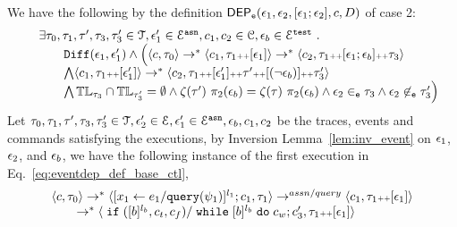 \begin{subproof}
%
\label{pf:eventdep_base_ctl}
We have the following by the definition $\mathsf{DEP_{\mathtt{e}}}(\mathtt{\epsilon}_1, \mathtt{\epsilon}_2, [\mathtt{\epsilon}_1; \mathtt{\epsilon}_2], c, D)$ of case 2:
\begin{equation}
  \label{eq:eventdep_def_base_ctl}
  \begin{array}{ll}   
    & \exists \mathtt{\tau}_0,
    \mathtt{\tau}_1, \mathtt{\tau}', \mathtt{\tau}_3, \mathtt{\tau}_3' \in \mathcal{T},\mathtt{\epsilon}_1' \in \mathcal{E}^{\mathtt{{asn}}}, {c}_1, {c}_2  \in \mathcal{C}, 
    \mathtt{\epsilon}_b \in \mathcal{E}^{\mathtt{{test}}}
    ~.~
    \\ 
   &   \qquad    \mathtt{Diff}(\mathtt{\epsilon}_1, \mathtt{\epsilon}_1') 
\land
   \Big(
  \langle {c}, \mathtt{\tau}_0 \rangle \rightarrow^{*} 
      \langle {c}_1, \mathtt{\tau}_1 {\scriptscriptstyle ++} [\mathtt{\epsilon}_1] \rangle  \rightarrow^{*} 
      \langle c_2,  \mathtt{\tau}_1 {\scriptscriptstyle ++} [\mathtt{\epsilon}_1;\mathtt{\epsilon}_b] {\scriptscriptstyle ++}  \mathtt{\tau}_3 \rangle 
    \\   
   & \qquad \bigwedge 
    \langle {c}_1, \mathtt{\tau}_1 {\scriptscriptstyle ++} [\mathtt{\epsilon}_1'] \rangle  \rightarrow^{*} 
    \langle c_2,  \mathtt{\tau}_1 {\scriptscriptstyle ++} [\mathtt{\epsilon}_1'] {\scriptscriptstyle ++} \mathtt{\tau}' {\scriptscriptstyle ++} [(\neg \mathtt{\epsilon}_b)] {\scriptscriptstyle ++} \mathtt{\tau}_3' \rangle 
    \\
    & \qquad \bigwedge  \mathbb{TL}_{\mathtt{\tau}_3} \cap \mathbb{TL}_{\mathtt{\tau}_3'} = \emptyset
     \land \mathtt{\zeta}(\mathtt{\tau}') ~  \pi_2(\mathtt{\epsilon}_b) = \mathtt{\zeta}(\mathtt{\tau}) ~  \pi_2(\mathtt{\epsilon}_b)
      \land \mathtt{\epsilon}_2 \in_{\mathtt{e}} \mathtt{\tau}_3
    \land \mathtt{\epsilon}_2 \not\in_{\mathtt{e}} \mathtt{\tau}_3'
   \Big)
 \end{array}
  \end{equation}
%
Let $\mathtt{\tau}_0,
\mathtt{\tau}_1, \mathtt{\tau}', \mathtt{\tau}_3, \mathtt{\tau}_3' \in \mathcal{T}, 
\mathtt{\epsilon}_2' \in \mathcal{E}, \mathtt{\epsilon}_1' \in \mathcal{E}^{\mathtt{{asn}}}, \mathtt{\epsilon}_b, {c}_1, {c}_2$ be the traces, events and commands satisfying the executions,
by Inversion Lemma~\ref{lem:inv_event} on 
$\mathtt{\epsilon}_1$, $\mathtt{\epsilon}_2$, and $\mathtt{\epsilon}_b$,
we have the following instance of the first execution in Eq.~\ref{eq:eventdep_def_base_ctl},
%
\begin{equation}
\label{eq:ctldep_inv1}
  \begin{array}{l}   
\langle {c}, \mathtt{\tau}_0 \rangle \rightarrow^{*} 
\langle [\mathrel{ {x}_1 \leftarrow e_1 / {\tt query}(\psi_1) }]^{l_1} ; {c}_1, \mathtt{\tau}_1 \rangle  
\rightarrow^{assn/query}
 \langle c_1, \mathtt{\tau}_1 {\scriptscriptstyle ++} [\mathtt{\epsilon}_1] \rangle 
 \\
  \qquad \rightarrow^{*} 
  \langle \;\mathtt{if}\; ([b]^{l_b}, c_t, c_f) / \;\mathtt{while}\; [b]^{l_b} \;\mathtt{do}\; c_w;{c}_3', 
  \mathtt{\tau}_1 {\scriptscriptstyle ++} [\mathtt{\epsilon}_1] \rangle 
  \\

\end{array}
\end{equation}
\end{subproof}
